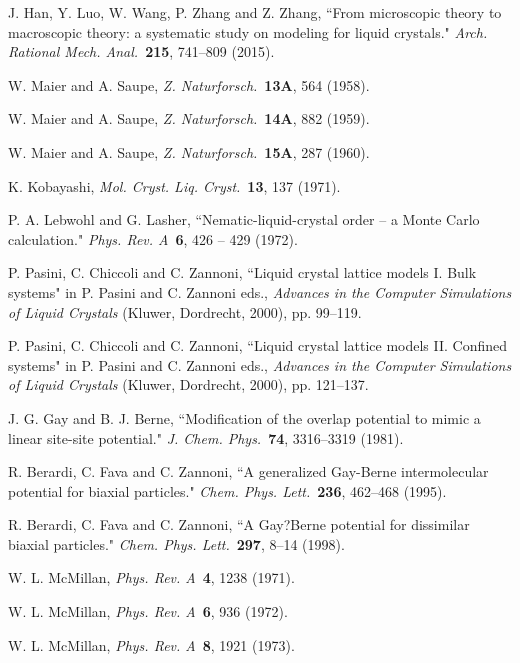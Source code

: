 \documentclass[jcp,aps,twocolumn,showpacs,supergroupedaddress,epsfig,amsmath,amssymb,eqsecnum]{revtex4}
\begin{document}
\begin{thebibliography}{99}
J. Han, Y. Luo, W. Wang, P. Zhang and Z. Zhang, 
``From microscopic theory to macroscopic theory: a systematic study on modeling for liquid crystals." 
{\em Arch. Rational Mech. Anal.}~{\bf 215}, 741--809 (2015). 

W. Maier and A. Saupe, {\em Z. Naturforsch.}~{\bf 13A}, 564 (1958).

W. Maier and A. Saupe, {\em Z. Naturforsch.}~{\bf 14A}, 882 (1959).

W. Maier and A. Saupe, {\em Z. Naturforsch.}~{\bf 15A}, 287 (1960).

K. Kobayashi, {\em Mol. Cryst. Liq. Cryst.}~{\bf 13}, 137 (1971). 

P. A. Lebwohl and G. Lasher, ``Nematic-liquid-crystal order -- a Monte Carlo calculation." 
{\em Phys. Rev. A}~{\bf 6}, 426 -- 429 (1972).

P. Pasini, C. Chiccoli and C. Zannoni, 
``Liquid crystal lattice models I. Bulk systems" 
in P. Pasini and C. Zannoni eds., {\em Advances in the Computer Simulations of Liquid Crystals} (Kluwer, Dordrecht, 2000), pp. 99--119. 

P. Pasini, C. Chiccoli and C. Zannoni, 
``Liquid crystal lattice models II. Confined systems" 
in P. Pasini and C. Zannoni eds., {\em Advances in the Computer Simulations of Liquid Crystals} (Kluwer, Dordrecht, 2000), pp. 121--137. 

J. G. Gay and B. J. Berne, ``Modification of the overlap potential to mimic a linear site-site potential." 
{\em J. Chem. Phys.}~{\bf 74}, 3316--3319 (1981). 

R. Berardi, C. Fava and C. Zannoni, ``A generalized Gay-Berne intermolecular potential for biaxial particles." 
{\em Chem. Phys. Lett.}~{\bf 236}, 462--468 (1995).

R. Berardi, C. Fava and C. Zannoni, ``A Gay?Berne potential for dissimilar biaxial particles." 
{\em Chem. Phys. Lett.}~{\bf 297}, 8--14 (1998). 

W. L. McMillan, {\em Phys. Rev. A}~{\bf 4}, 1238 (1971). 

W. L. McMillan, {\em Phys. Rev. A}~{\bf 6}, 936 (1972). 

W. L. McMillan, {\em Phys. Rev. A}~{\bf 8}, 1921 (1973). 


\end{thebibliography}
\end{document}
